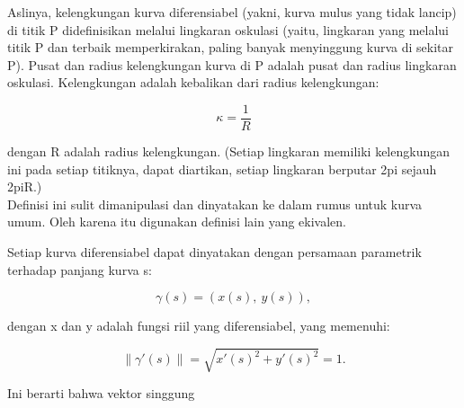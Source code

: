 \documentclass[12pt,arial,letterpaper]{book}
\begin{document}
\begin{eulercomment}
\begin{eulercomment}
\begin{eulercomment}
\begin{eulercomment}
\begin{eulercomment}
\begin{eulercomment}
\begin{eulercomment}
\begin{eulercomment}
\begin{eulercomment}
\begin{eulercomment}
\begin{eulercomment}
\begin{eulercomment}
\begin{eulercomment}
\begin{eulercomment}
\begin{eulercomment}
\begin{eulercomment}
\begin{eulercomment}
\begin{eulercomment}
\begin{eulercomment}
\begin{eulercomment}
\begin{eulercomment}
\begin{eulercomment}
\begin{eulercomment}
Aslinya, kelengkungan kurva diferensiabel (yakni, kurva mulus yang
tidak lancip) di titik P didefinisikan melalui lingkaran oskulasi
(yaitu, lingkaran yang melalui titik P dan terbaik memperkirakan,
paling banyak menyinggung kurva di sekitar P). Pusat dan radius
kelengkungan kurva di P adalah pusat dan radius lingkaran oskulasi.
Kelengkungan adalah kebalikan dari radius kelengkungan:

\end{eulercomment}
\begin{eulerformula}
\[
\kappa =\frac {1}{R}
\]
\end{eulerformula}
\begin{eulercomment}
dengan R adalah radius kelengkungan. (Setiap lingkaran memiliki
kelengkungan ini pada setiap titiknya, dapat diartikan, setiap
lingkaran berputar 2pi sejauh 2piR.)\\
Definisi ini sulit dimanipulasi dan dinyatakan ke dalam rumus untuk
kurva umum. Oleh karena itu digunakan definisi lain yang ekivalen.

\end{eulercomment}
\begin{eulercomment}
Setiap kurva diferensiabel dapat dinyatakan dengan persamaan
parametrik terhadap panjang kurva s:

\end{eulercomment}
\begin{eulerformula}
\[
\gamma(s) = (x(s),\ y(s)),
\]
\end{eulerformula}
\begin{eulercomment}
dengan x dan y adalah fungsi riil yang diferensiabel, yang memenuhi:

\end{eulercomment}
\begin{eulerformula}
\[
\|\gamma'(s)\|=\sqrt{x'(s)^2+y'(s)^2}=1.
\]
\end{eulerformula}
\begin{eulercomment}
Ini berarti bahwa vektor singgung



\end{eulercomment}
\end{eulercomment}
\end{eulercomment}
\end{eulercomment}
\end{eulercomment}
\end{eulercomment}
\end{eulercomment}
\end{eulercomment}
\end{eulercomment}
\end{eulercomment}
\end{eulercomment}
\end{eulercomment}
\end{eulercomment}
\end{eulercomment}
\end{eulercomment}
\end{eulercomment}
\end{eulercomment}
\end{eulercomment}
\end{eulercomment}
\end{eulercomment}
\end{eulercomment}
\end{eulercomment}
\end{eulercomment}
\end{document}
